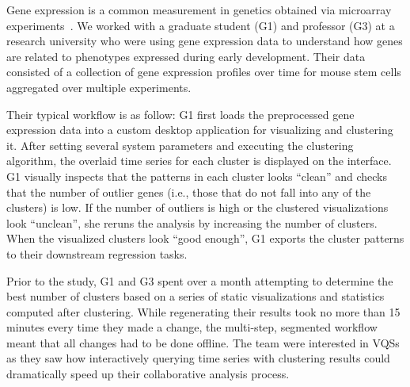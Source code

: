 \par\noindent{} Gene expression is a common measurement in genetics obtained via microarray experiments~\cite{Gloss2017}.  We worked with a graduate student (G1) and professor (G3) at a research university who were using gene expression data to understand how genes are related to phenotypes expressed during early development. Their data consisted of a collection of gene expression profiles over time for mouse stem cells aggregated over multiple experiments. %
\par Their typical workflow is as follow: G1 first loads the preprocessed gene expression data into a custom desktop application for visualizing and clustering it. After setting several system parameters and executing the clustering algorithm, the overlaid time series for each cluster is displayed on the interface. G1 visually inspects that the patterns in each cluster looks ``clean'' and checks that the number of outlier genes (i.e., those that do not fall into any of the clusters) is low.  If the number of outliers is high or the clustered visualizations look ``unclean'', she reruns the analysis by increasing the number of clusters. When the visualized clusters look ``good enough'', G1 exports the cluster patterns to their downstream regression tasks.
\par Prior to the study, G1 and G3 spent over a month attempting to determine the best number of clusters based on a series of static visualizations and statistics computed after clustering. While regenerating their results took no more than 15 minutes every time they made a change, the multi-step, segmented workflow meant that all changes had to be done offline. The team were interested in VQSs as they saw how interactively querying time series with clustering results could dramatically speed up their collaborative analysis process.
